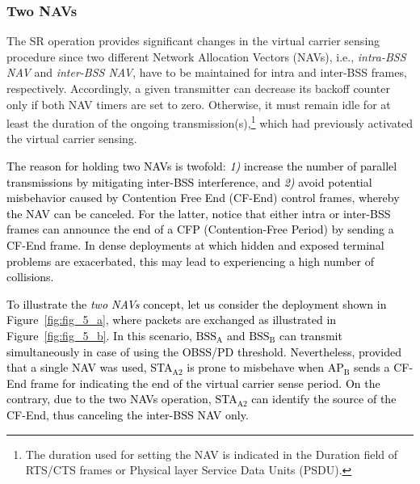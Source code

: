 \documentclass[preprint,12pt]{elsarticle}
\theoremstyle{plain}
\begin{document}
\subsubsection{Two NAVs}
\label{section:two_navs}
The SR operation provides significant changes in the virtual carrier sensing procedure since two different Network Allocation Vectors (NAVs), i.e., \emph{intra-BSS NAV} and \emph{inter-BSS NAV}, have to be maintained for intra and inter-BSS frames, respectively. Accordingly, a given transmitter can decrease its backoff counter only if both NAV timers are set to zero. Otherwise, it must remain idle for at least the duration of the ongoing transmission(s),\footnote{The duration used for setting the NAV is indicated in the Duration field of RTS/CTS frames or Physical layer Service Data Units (PSDU).} which had previously activated the virtual carrier sensing. 

\textcolor{black}{The reason for holding two NAVs is twofold: \emph{1)} increase the number of parallel transmissions by mitigating inter-BSS interference, and \emph{2)} avoid potential misbehavior caused by Contention Free End (CF-End) control frames, whereby the NAV can be canceled. For the latter, notice that either intra or inter-BSS frames can announce the end of a CFP (Contention-Free Period) by sending a CF-End frame. In dense deployments at which hidden and exposed terminal problems are exacerbated, this may lead to experiencing a high number of collisions.}

\textcolor{black}{To illustrate the \emph{two NAVs} concept, let us consider the deployment shown in Figure~\ref{fig:fig_5_a}, where packets are exchanged as illustrated in Figure~\ref{fig:fig_5_b}. In this scenario, $\text{BSS}_\text{A}$ and $\text{BSS}_\text{B}$ can transmit simultaneously in case of using the OBSS/PD threshold. Nevertheless, provided that a single NAV was used, STA$_{\text{A2}}$ is prone to misbehave when AP$_\text{B}$ sends a CF-End frame for indicating the end of the virtual carrier sense period. On the contrary, due to the two NAVs operation, STA$_{\text{A2}}$ can identify the source of the CF-End, thus canceling the inter-BSS NAV only.}
\end{document}
